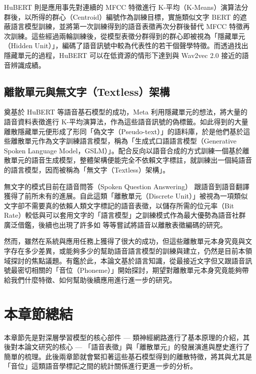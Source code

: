 HuBERT 則是應用事先對連續的 MFCC 特徵進行 K-平均（K-Means）演算法分群後，以所得的群心（Centroid）編號作為訓練目標，實施類似文字 BERT 的遮蔽語言模型訓練，並將第一次訓練得到的語音表徵再次分群後替代 MFCC 特徵再次訓練。這些經過兩輪訓練後，從模型表徵分群得到的群心即被視為「隱藏單元（Hidden Unit）」，編碼了語音訊號中較為代表性的若干個聲學特徵。而透過找出隱藏單元的過程，HuBERT 可以在低資源的情形下達到與 Wav2vec 2.0 接近的語音辨識成績。

\subsection{離散單元與無文字（Textless）架構}

奠基於 HuBERT 等語音基石模型的成功，Meta 利用隱藏單元的想法，將大量的語音資料表徵進行 K-平均演算法，作為這些語音訊號的偽標籤。如此得到的大量離散隱藏單元便形成了形同「偽文字（Pseudo-text）」的語料庫，於是他們基於這些離散單元作為文字訓練語言模型，稱為「生成式口語語言模型（Generative Spoken Language Model，GSLM）」。配合反向以語音合成的方式訓練一個基於離散單元的語音生成模型，整體架構便能完全不依賴文字標註，就訓練出一個純語音的語言模型，因而被稱為「無文字（Textless）架構」\cite{noauthor_textless_2021}。

無文字的模式目前在語音問答（Spoken Question Answering）\cite{lin2022dual} 跟語音到語音翻譯 \cite{chen_speech--speech_2023} 獲得了前所未有的進展。自此這類「離散單元（Discrete Unit）」被視為一項類似文字卻不需要真的依賴人類文字標記的語音表徵，以儲存所需的位元率（Bit Rate）較低與可以套用文字的「語言模型」之訓練模式作為最大優勢為語音社群廣泛借鑑，後續也出現了許多如 \cite{zhang2024speechtokenizer} 等等嘗試將語音以離散表徵編碼的研究。

然而，雖然在系統與應用任務上獲得了很大的成功，但這些離散單元本身究竟與文字存在多少差異，或能夠多少的幫助語音語言模型的訓練與建立，仍然是目前本領域探討的焦點議題。有鑑於此，本論文基於語言知識，從最接近文字但又跟語音訊號最密切相關的「音位（Phoneme）」開始探討，期望對離散單元本身究竟能夠帶給我們什麼特徵、如何幫助後續應用進行進一步的研究。

\section{本章節總結}

本章節先是對深層學習模型的核心部件 --- 類神經網路進行了基本原理的介紹，其後對本論文研究的核心 --- 「語音表徵」與「離散單元」的發展演進與歷史進行了簡單的梳理。此後兩章節就會緊扣著這些基石模型得到的離散特徵，將其與尤其是「音位」這類語音學標記之間的統計關係進行更進一步的分析。
